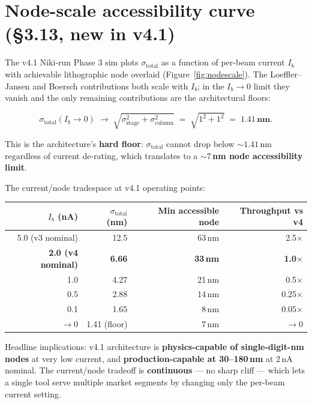 \documentclass[11pt,letterpaper]{article}
\begin{document}
\section{Node-scale accessibility curve (\S 3.13, new in v4.1)}

The v4.1 Niki-run Phase 3 sim plots $\sigma_\text{total}$ as a function of per-beam current $I_b$ with achievable lithographic node overlaid (Figure~\ref{fig:nodescale}). The Loeffler--Jansen and Boersch contributions both scale with $I_b$; in the $I_b \to 0$ limit they vanish and the only remaining contributions are the architectural floors:

\begin{equation}
\sigma_\text{total}(I_b \to 0) \;\to\; \sqrt{\sigma_\text{stage}^2 + \sigma_\text{column}^2} \;=\; \sqrt{1^2 + 1^2} \;=\; \mathbf{1.41\,\text{nm}}.
\end{equation}

This is the architecture's \textbf{hard floor}: $\sigma_\text{total}$ cannot drop below $\sim 1.41$\,nm regardless of current de-rating, which translates to a \textbf{$\sim 7$\,nm node accessibility limit}.

The current/node tradespace at v4.1 operating points:

\begin{center}
\begin{tabular}{rrrr}
\toprule
$I_b$ (nA) & $\sigma_\text{total}$ (nm) & Min accessible node & Throughput vs v4 \\
\midrule
5.0 (v3 nominal) & 12.5 & 63\,nm & 2.5$\times$ \\
\textbf{2.0 (v4 nominal)} & \textbf{6.66} & \textbf{33\,nm} & \textbf{1.0$\times$} \\
1.0 & 4.27 & 21\,nm & 0.5$\times$ \\
0.5 & 2.88 & 14\,nm & 0.25$\times$ \\
0.1 & 1.65 & 8\,nm & 0.05$\times$ \\
$\to 0$ & 1.41 (floor) & 7\,nm & $\to 0$ \\
\bottomrule
\end{tabular}
\end{center}

Headline implications: v4.1 architecture is \textbf{physics-capable of single-digit-nm nodes} at very low current, and \textbf{production-capable at 30--180\,nm} at 2\,nA nominal. The current/node tradeoff is \textbf{continuous} --- no sharp cliff --- which lets a single tool serve multiple market segments by changing only the per-beam current setting.
\end{document}
